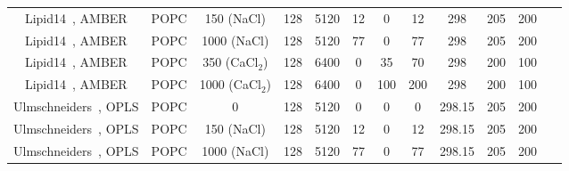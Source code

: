 \documentclass[pre,aps,floatfix,authordate1-4,twocolumn]{revtex4-1}
\begin{document}
\begin{table}[htb]
\begin{tabular}{c c c c c c c c c c c c}
  Lipid14~\cite{dickson14}, AMBER\cite{aqvist90}   &   POPC & 150 (NaCl) & 128 & 5120 & 12 & 0 & 12 & 298 & 205 & 200 &~\cite{lipid14POPC150mMNaClfiles}  \\
  Lipid14~\cite{dickson14}, AMBER\cite{aqvist90}   &   POPC & 1000 (NaCl) & 128 & 5120 & 77 & 0 & 77 & 298 & 205 & 200 &~\cite{lipid14POPC1000mMNaClfiles}  \\
  Lipid14~\cite{dickson14}, AMBER\cite{aqvist90}   &   POPC & 350 (CaCl$_2$) & 128 & 6400 & 0 & 35 & 70 & 298 & 200 & 100 &~\cite{lipid14POPC350mMCaClfiles}  \\
  Lipid14~\cite{dickson14}, AMBER\cite{aqvist90}   &   POPC & 1000 (CaCl$_2$) & 128 & 6400 & 0 & 100 & 200 & 298 & 200 & 100 &~\cite{lipid14POPC1000mMCaClfiles}  \\
  \hline
  Ulmschneiders~\cite{Ulmschneider09}, OPLS\cite{aqvist90}       &   POPC & 0          & 128 & 5120 & 0 & 0  & 0 & 298.15 & 205 & 200 &~\cite{ulmschneiderPOPC0mMNaClfiles}  \\
  Ulmschneiders~\cite{Ulmschneider09}, OPLS\cite{aqvist90}       &   POPC & 150 (NaCl) & 128 & 5120 & 12 & 0  & 12 & 298.15 & 205 & 200 &~\cite{ulmschneiderPOPC150mMNaClfiles}  \\
  Ulmschneiders~\cite{Ulmschneider09}, OPLS\cite{aqvist90}       &   POPC & 1000 (NaCl) & 128 & 5120 & 77 & 0  & 77 & 298.15 & 205 & 200 &~\cite{ulmschneiderPOPC1000mMNaClfiles}  \\
\end{tabular}
\end{table} 
\end{document}
